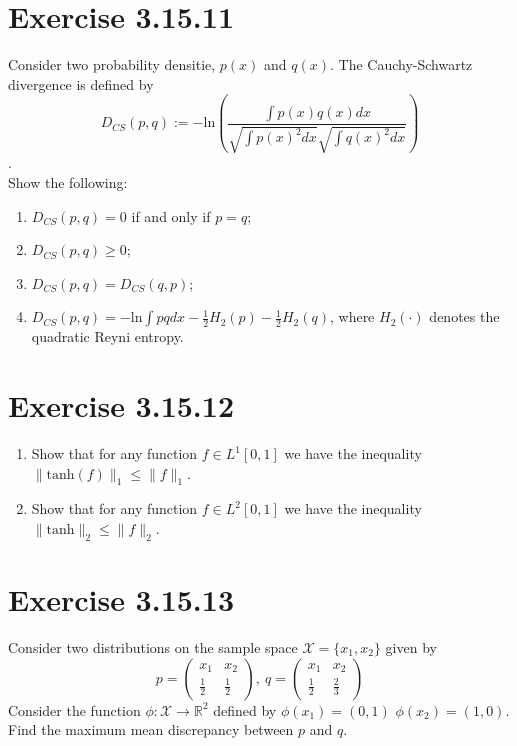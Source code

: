 \documentclass{exam}
\begin{document}
\section*{Exercise 3.15.11}
Consider two probability densitie, $p(x)$ and $q(x)$. The Cauchy-Schwartz divergence is defined by 
\begin{equation*}
    D_{CS}(p,q) := -\text{ln}(\displaystyle\frac{\int p(x) q(x) d x}{\sqrt{\int p(x)^2 d x } \sqrt{\int q(x)^2 d x }})
\end{equation*}.\\
Show the following: 
\begin{enumerate}
    \item $D_{CS}(p,q) = 0$ if and only if $p = q$;
    \item $D_{CS}(p,q) \geq 0$;
    \item $D_{CS}(p,q) = D_{CS}(q,p)$;
    \item $D_{CS}(p,q) = \displaystyle-\text{ln}\int pq d x  - \frac{1}{2}H_2(p) - \frac{1}{2}H_2(q)$, where $H_2(\cdot)$ denotes the quadratic Reyni entropy.
\end{enumerate}

\section*{Exercise 3.15.12}
\begin{enumerate}
    \item Show that for any function $f \in L^{1}[0,1]$ we have the inequality $\lVert \text{tanh}(f) \rVert_{1} \leq \lVert f \rVert_{1}$.
    \item Show that for any function $f \in L^{2} [0,1]$ we have the inequality $\lVert \text{tanh} \rVert_{2} \leq \lVert f \rVert_{2}$.
\end{enumerate}

\section*{Exercise 3.15.13}
Consider two distributions on the sample space $\mathcal{X} = \{ x_1, x_2\}$ given by 
\begin{equation*}
    p = \begin{pmatrix}
        x_1 & x_2 \\
        \frac{1}{2} & \frac{1}{2}
        \end{pmatrix}, \ q = \begin{pmatrix}
            x_1 & x_2\\
            \frac{1}{2} & \frac{2}{3}
            \end{pmatrix}
\end{equation*}
Consider the function $\phi: \mathcal{X} \to \mathbb{R}^2$ defined by $\phi(x_1) = (0,1)$ $\phi(x_2) = (1,0)$. Find the maximum mean discrepancy between $p$ and $q$.
\end{document}
